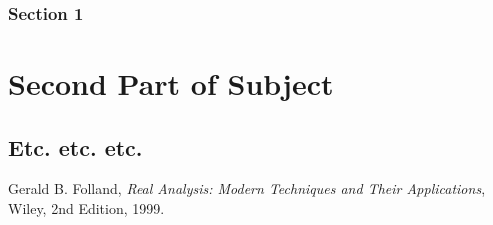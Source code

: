 \documentclass[twoside, titlepage]{amsbook}
\theoremstyle{plain} %
\theoremstyle{definition}
\theoremstyle{remark}
\theoremstyle{notation}
\begin{document}
		\section{Section 1}
		
			

\part{Second Part of Subject}

	\chapter{Etc. etc. etc.}
	
		
	
\clearpage

\begin{thebibliography}{"Fol99"}
	Gerald B. Folland,
	\emph{Real Analysis: Modern Techniques and Their Applications},
	Wiley,
	2nd Edition,
	1999.	
\end{thebibliography}
\end{document}
